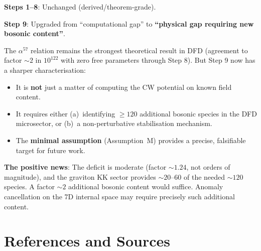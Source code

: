 \documentclass[11pt,a4paper]{article}
\begin{document}
\begin{tcolorbox}[colback=blue!5!white, colframe=blue!60!black,
  title=\textbf{Revised $\alpha^{57}$ Status}]

\textbf{Steps 1--8}: Unchanged (derived/theorem-grade).

\textbf{Step 9}: Upgraded from ``computational gap'' to
\textbf{``physical gap requiring new bosonic content''}.

The $\alpha^{57}$ relation remains the strongest theoretical
result in DFD (agreement to factor $\sim 2$ in $10^{122}$ with
zero free parameters through Step 8). But Step 9 now has a
sharper characterisation:

\begin{itemize}[nosep]
\item It is \textbf{not} just a matter of computing the CW
  potential on known field content.
\item It requires either (a)~identifying $\geq 120$ additional
  bosonic species in the DFD microsector, or (b)~a
  non-perturbative stabilisation mechanism.
\item The \textbf{minimal assumption} (Assumption~M) provides
  a precise, falsifiable target for future work.
\end{itemize}

\textbf{The positive news}: The deficit is moderate (factor
$\sim 1.24$, not orders of magnitude), and the graviton KK
sector provides $\sim 20$--$60$ of the needed $\sim 120$
species. A factor $\sim 2$ additional bosonic content would
suffice. Anomaly cancellation on the 7D internal space may
require precisely such additional content.

\end{tcolorbox}


\section*{References and Sources}
\end{document}
